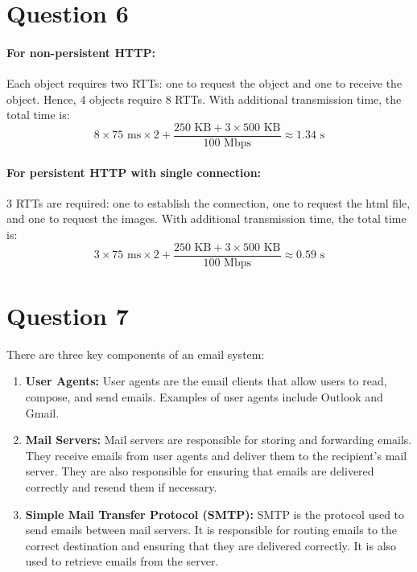 \documentclass[a4paper,12pt]{article}
\begin{document}
\section*{Question 6}

\paragraph{For non-persistent HTTP:}

Each object requires two RTTs: one to request the object and one to receive the object. Hence, 4 objects require 8 RTTs. With additional transmission time, the total time is:
\begin{equation*}
  8 \times 75 \text{ ms} \times 2 + \frac{250 \text{ KB} + 3 \times 500 \text{ KB}}{100 \text{ Mbps}} \approx 1.34 \text{ s}
\end{equation*}

\paragraph{For persistent HTTP with single connection:}

3 RTTs are required: one to establish the connection, one to request the html file, and one to request the images. With additional transmission time, the total time is:
\begin{equation*}
  3 \times 75 \text{ ms} \times 2 + \frac{250 \text{ KB} + 3 \times 500 \text{ KB}}{100 \text{ Mbps}} \approx 0.59 \text{ s}
\end{equation*}

\section*{Question 7}

There are three key components of an email system:
\begin{enumerate}
  \item \textbf{User Agents:} User agents are the email clients that allow users to read, compose, and send emails. Examples of user agents include Outlook and Gmail.
  \item \textbf{Mail Servers:} Mail servers are responsible for storing and forwarding emails. They receive emails from user agents and deliver them to the recipient's mail server. They are also responsible for ensuring that emails are delivered correctly and resend them if necessary.
  \item \textbf{Simple Mail Transfer Protocol (SMTP):} SMTP is the protocol used to send emails between mail servers. It is responsible for routing emails to the correct destination and ensuring that they are delivered correctly. It is also used to retrieve emails from the server.
\end{enumerate}
\end{document}
